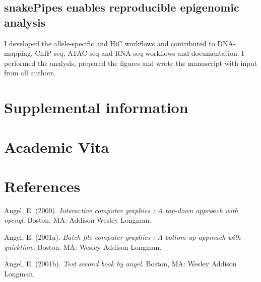 \documentclass[11pt,twoside]{MPIthesis}
\begin{document}


\section{snakePipes enables reproducible epigenomic
analysis}\label{snakepipes-enables-reproducible-epigenomic-analysis}

I developed the allele-specific and HiC workflows and contributed to
DNA-mapping, ChIP-seq, ATAC-seq and RNA-seq workflows and documentation.
I performed the analysis, prepared the figures and wrote the manuscript
with input from all authors.



\chapter{Supplemental information}\label{supplemental-information}

\chapter{Academic Vita}\label{academic-vita}

\backmatter

\chapter*{References}\label{references}


\noindent

\setlength{\parindent}{-0.20in} \setlength{\leftskip}{0.20in}
\setlength{\parskip}{8pt}

\hypertarget{refs}{}
\hypertarget{ref-angel2000}{}
Angel, E. (2000). \emph{Interactive computer graphics : A top-down
approach with opengl}. Boston, MA: Addison Wesley Longman.

\hypertarget{ref-angel2001}{}
Angel, E. (2001a). \emph{Batch-file computer graphics : A bottom-up
approach with quicktime}. Boston, MA: Wesley Addison Longman.

\hypertarget{ref-angel2002a}{}
Angel, E. (2001b). \emph{Test second book by angel}. Boston, MA: Wesley
Addison Longman.


\end{document}
